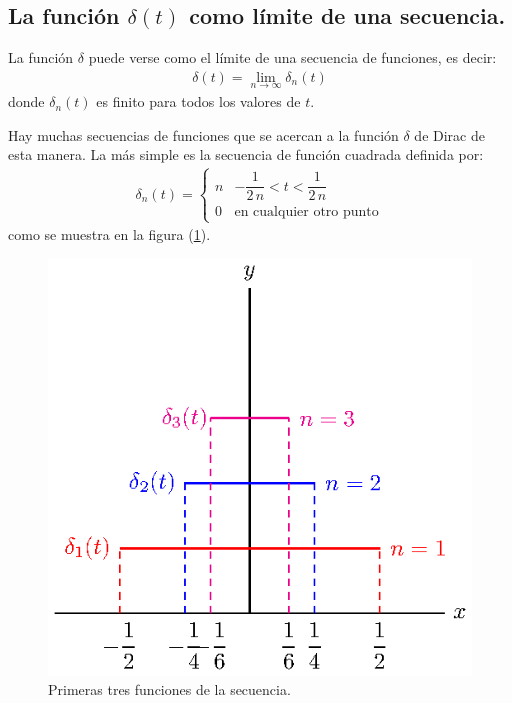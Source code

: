 \subsection{La función \texorpdfstring{$\delta(t)$}{d(t)} como límite de una secuencia.}

La función $\delta$ puede verse como el límite de una secuencia de funciones, es decir:
\begin{align}
\delta(t) = \lim_{n \to \infty} \delta_{n} (t)
\label{eq:ecuacion_05_10}
\end{align}
donde $\delta_{n}(t)$ es finito para todos los valores de $t$.
\par
Hay muchas secuencias de funciones que se acercan a la función $\delta$ de Dirac de esta manera. La más simple es la secuencia de función cuadrada definida por:
\begin{align}
\delta_{n} (t) = \begin{cases}
n & -\dfrac{1}{2 \, n} < t < \dfrac{1}{2 \, n} \\
0 & \mbox{en cualquier otro punto}
\end{cases}
\label{eq:ecuacion_05_11}
\end{align}
como se muestra en la figura (\ref{fig:figura_05_06}).
\begin{figure}[H]
    \centering
    \includegraphics[scale=1.3]{Imagenes/plot_secuencia_delta_02.eps}
    \caption{Primeras tres funciones de la secuencia.}
    \label{fig:figura_05_06}
\end{figure}
